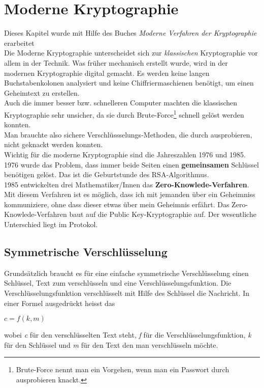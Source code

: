 \section{Moderne Kryptographie}
Dieses Kapitel wurde mit Hilfe des Buches \textit{Moderne Verfahren der Kryptographie} erarbeitet\\[2ex]
Die Moderne Kryptographie unterscheidet sich zur \textit{klassischen} Kryptographie vor allem in der Technik. Was früher mechanisch erstellt wurde, wird in der modernen Kryptographie digital gemacht. Es werden keine langen Buchstabenkolonen analysiert und keine Chiffriermaschienen benötigt, um einen Geheimtext zu erstellen.\\
Auch die immer besser bzw. schnelleren Computer machten die klassischen Kryptographie sehr unsicher, da sie durch Brute-Force\footnote{Brute-Force nennt man ein Vorgehen, wenn man ein Passwort durch ausprobieren knackt.} schnell gelöst werden konnten.\\
Man brauchte also sichere Verschlüssselungs-Methoden, die durch ausprobieren, nicht geknackt werden konnten.\\
Wichtig für die moderne Kryptographie sind die Jahreszahlen 1976 und 1985.\\
1976 wurde das Problem, dass immer beide Seiten einen \textbf{gemeinsamen} Schlüssel benötigen gelöst. Das ist die Geburtstunde des RSA-Algorithmus.\\
1985 entwickelten drei Mathematiker/Innen das \textbf{Zero-Knowlede-Verfahren}. Mit diesem Verfahren ist es möglich, dass ich mit jemanden über ein Geheimniss kommuniziere, ohne dass dieser etwas über mein Geheimnis erfährt. Das Zero-Knowlede-Verfahren baut auf die Public Key-Kryptographie auf. Der wesentliche Unterschied liegt im Protokol.
%
\subsection{Symmetrische Verschlüsselung}
Grundsätzlich braucht es für eine einfache symmetrische Verschlüsselung einen Schlüssel, Text zum verschlüsseln und eine Verschlüsselungsfunktion.
Die Verschlüsselungsfunktion verschlüsselt mit Hilfe des Schlüssel die Nachricht.
In einer Formel ausgedrückt heisst das
 \begin{center}
$c = f ( k, m )$
 \end{center}
wobei \textit{c} für den verschlüsselten Text steht, \textit{f} für die Verschlüsselungsfunktion, \textit{k} für den Schlüssel und \textit{m} für den Text den man verschlüsseln möchte.\\

